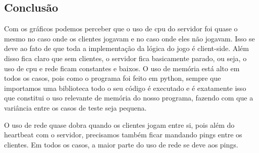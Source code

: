 \documentclass[12pt]{beamer}
\begin{document}
\subsection{Conclusão}
\begin{frame}
  Com os gráficos podemos perceber que o uso de cpu do servidor foi quase o mesmo no caso onde os clientes jogavam e no caso onde eles não jogavam. Isso se deve ao fato de que toda a implementação da lógica do jogo é client-side. Além disso fica claro que sem clientes, o servidor fica basicamente parado, ou seja, o uso de cpu e rede ficam constantes e baixos. O uso de memória está alto em todos os casos, pois como o programa foi feito em python, sempre que importamos uma biblioteca todo o seu código é executado e é exatamente isso que constitui o uso relevante de memória do nosso programa, fazendo com que a variância entre os casos de teste seja pequena.
\end{frame}
\begin{frame}
  O uso de rede quase dobra quando os clientes jogam entre si, pois além do heartbeat com o servidor, precisamos também ficar mandando pings entre os clientes. Em todos os casos, a maior parte do uso de rede se deve aos pings.
\end{frame}
\end{document}
